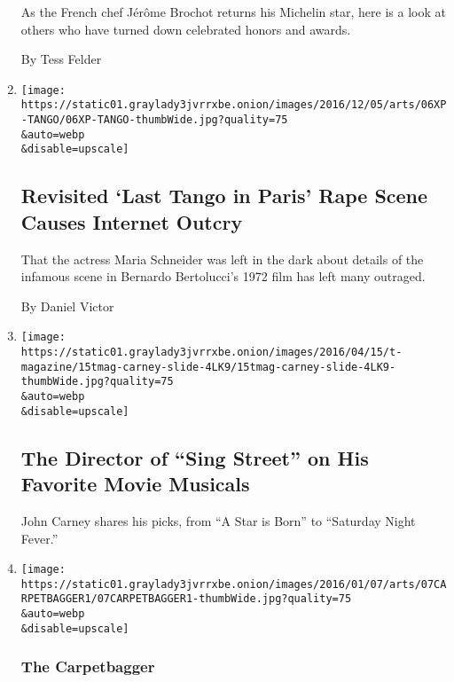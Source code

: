 \begin{enumerate}
  As the French chef Jérôme Brochot returns his Michelin star, here is a
  look at others who have turned down celebrated honors and awards.

  By Tess Felder
\item
  \href{/2016/12/05/movies/revisted-last-tango-in-paris-rape-scene-causes-internet-outcry.html}{}

  \texttt{[image: https://static01.graylady3jvrrxbe.onion/images/2016/12/05/arts/06XP-TANGO/06XP-TANGO-thumbWide.jpg?quality=75\\\&auto=webp\\\&disable=upscale]}

  \hypertarget{revisited-last-tango-in-paris-rape-scene-causes-internet-outcry}{%
  \subsection{Revisited `Last Tango in Paris' Rape Scene Causes Internet
  Outcry}\label{revisited-last-tango-in-paris-rape-scene-causes-internet-outcry}}

  That the actress Maria Schneider was left in the dark about details of
  the infamous scene in Bernardo Bertolucci's 1972 film has left many
  outraged.

  By Daniel Victor
\item
  \href{/slideshow/2016/04/15/t-magazine/the-director-of-sing-street-on-his-favorite-movie-musicals.html}{}

  \texttt{[image: https://static01.graylady3jvrrxbe.onion/images/2016/04/15/t-magazine/15tmag-carney-slide-4LK9/15tmag-carney-slide-4LK9-thumbWide.jpg?quality=75\\\&auto=webp\\\&disable=upscale]}

  \hypertarget{the-director-of-sing-street-on-his-favorite-movie-musicals}{%
  \subsection{The Director of ``Sing Street'' on His Favorite Movie
  Musicals}\label{the-director-of-sing-street-on-his-favorite-movie-musicals}}

  John Carney shares his picks, from ``A Star is Born'' to ``Saturday
  Night Fever.''
\item
  \href{/2016/01/07/movies/the-power-of-documentaries-on-the-oscar-trail.html}{}

  \texttt{[image: https://static01.graylady3jvrrxbe.onion/images/2016/01/07/arts/07CARPETBAGGER1/07CARPETBAGGER1-thumbWide.jpg?quality=75\\\&auto=webp\\\&disable=upscale]}

  \hypertarget{the-carpetbagger}{%
  \subsubsection{The Carpetbagger}\label{the-carpetbagger}}


\end{enumerate}
